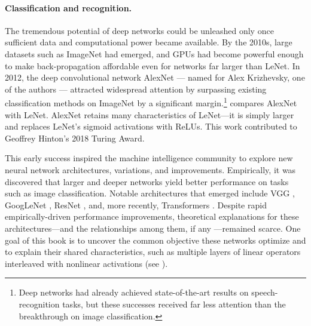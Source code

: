 \documentclass[../../book-main.tex]{subfiles}
\begin{document}
\paragraph{Classification and recognition.}
The tremendous potential of deep networks could be unleashed only
once sufficient data and computational power became available. By the
2010s, large datasets such as ImageNet had emerged, and GPUs had
become powerful enough to make back-propagation affordable even for
networks far larger than LeNet. In 2012, the deep convolutional
network AlexNet --- named for Alex Krizhevsky, one of the authors
\cite{krizhevsky2012imagenet} --- attracted widespread attention by
surpassing existing classification methods on ImageNet by a
significant margin.\footnote{Deep networks had already achieved
    state-of-the-art results on speech-recognition tasks, but these
    successes received far less attention than the breakthrough on image
classification.}  compares AlexNet with
LeNet. AlexNet retains many characteristics of LeNet---it is simply
larger and replaces LeNet's sigmoid activations with ReLUs. This work
contributed to Geoffrey Hinton's 2018 Turing Award.

This early success inspired the machine intelligence community to
explore new neural network architectures, variations, and
improvements. Empirically, it was discovered that larger and deeper
networks yield better performance on tasks such as image
classification. Notable architectures that emerged include VGG
\cite{Simonyan15}, GoogLeNet \cite{Szegedy2014GoingDW}, ResNet
\cite{He2016-lc}, and, more recently, Transformers
\cite{vaswani2017attention}. Despite rapid empirically-driven
performance improvements, theoretical explanations for these
architectures---and the relationships among them, if any ---remained
scarce. One goal of this book is to uncover the common objective
these networks optimize and to explain their shared characteristics,
such as multiple layers of linear operators interleaved with
nonlinear activations (see ).
\end{document}
